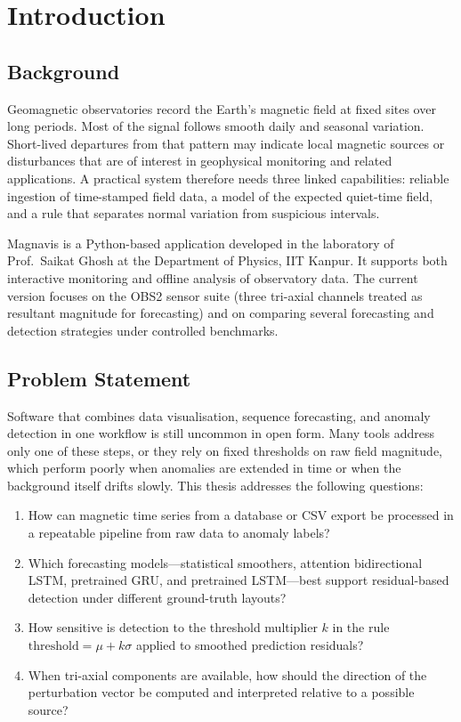 \chapter{Introduction}
\label{Chapter1}

\section{Background}
Geomagnetic observatories record the Earth's magnetic field at fixed sites over long periods. Most of the signal follows smooth daily and seasonal variation. Short-lived departures from that pattern may indicate local magnetic sources or disturbances that are of interest in geophysical monitoring and related applications. A practical system therefore needs three linked capabilities: reliable ingestion of time-stamped field data, a model of the expected quiet-time field, and a rule that separates normal variation from suspicious intervals.

Magnavis is a Python-based application developed in the laboratory of Prof.\ Saikat Ghosh at the Department of Physics, IIT Kanpur. It supports both interactive monitoring and offline analysis of observatory data. The current version focuses on the OBS2 sensor suite (three tri-axial channels treated as resultant magnitude for forecasting) and on comparing several forecasting and detection strategies under controlled benchmarks.

\section{Problem Statement}
Software that combines data visualisation, sequence forecasting, and anomaly detection in one workflow is still uncommon in open form. Many tools address only one of these steps, or they rely on fixed thresholds on raw field magnitude, which perform poorly when anomalies are extended in time or when the background itself drifts slowly. This thesis addresses the following questions:
\begin{enumerate}[label=(\alph*)]
    \item How can magnetic time series from a database or CSV export be processed in a repeatable pipeline from raw data to anomaly labels?
    \item Which forecasting models---statistical smoothers, attention bidirectional LSTM, pretrained GRU, and pretrained LSTM---best support residual-based detection under different ground-truth layouts?
    \item How sensitive is detection to the threshold multiplier $k$ in the rule $\text{threshold} = \mu + k\sigma$ applied to smoothed prediction residuals?
    \item When tri-axial components are available, how should the direction of the perturbation vector be computed and interpreted relative to a possible source?
\end{enumerate}

